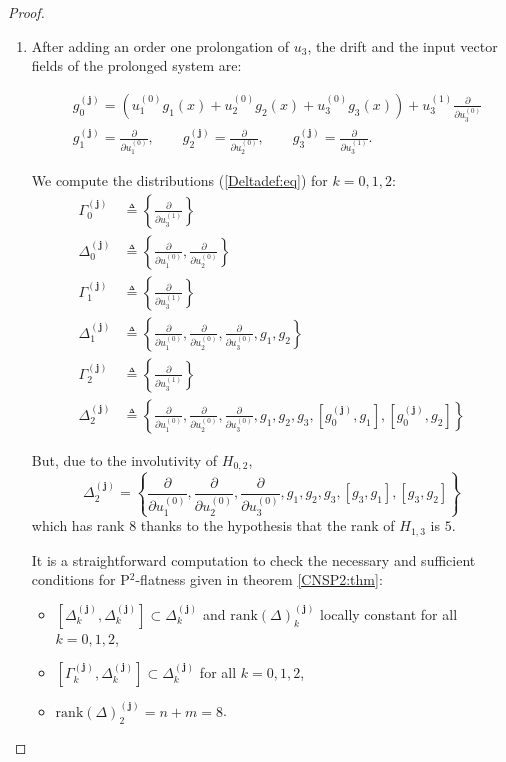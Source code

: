 \documentclass[10pt,a4paper]{amsart}
\newcommand{\ddu}[2]{\frac{\partial}{\partial u_{#1}^{(#2)}}}
\newcommand{\mbf}[1]{\mathbf{#1}}
\newcommand{\rk}[1]{\mathrm{rank} \left(#1\right)}
\begin{document}
\begin{proof}

\begin{enumerate}
  \item After adding an order one prolongation of $u_3$, the drift and the input vector fields  of the prolonged system are:

\begin{equation}\label{prolvecfields5states:eq}
\begin{aligned}
&g_{0}^{(\mbf{j})}= \left(u_{1}^{(0)}g_{1}(x) + u_{2}^{(0)}g_{2}(x) + u_{3}^{(0)}g_{3}(x)\right) +   u_{3}^{(1)}\ddu{3}{0}\\
&g_{1}^{(\mbf{j})}= \ddu{1}{0}, \qquad g_{2}^{(\mbf{j})}= \ddu{2}{0}, \qquad g_{3}^{(\mbf{j})}= \ddu{3}{1}.
\end{aligned}
\end{equation}

We compute the distributions (\ref{Deltadef:eq}) for $k=0,1,2$:
\begin{equation}
\begin{aligned}
 \Gamma_{0}^{(\mbf{j})} &\triangleq \left\{ \ddu{3}{1} \right\} \\
\Delta_{0}^{(\mbf{j})} &\triangleq \left\{ \ddu{1}{0}  , \ddu{2}{0} \right\}\\
\Gamma_{1}^{(\mbf{j})} &\triangleq \left\{ \ddu{3}{1} \right\} \\
\Delta_{1}^{(\mbf{j})} &\triangleq \left\{ \ddu{1}{0}  , \ddu{2}{0}, \ddu{3}{0}, g_1, g_2 \right\}\\
\Gamma_{2}^{(\mbf{j})} &\triangleq \left\{ \ddu{3}{1} \right\} \\
\Delta_{2}^{(\mbf{j})} &\triangleq \left\{ \ddu{1}{0}  , \ddu{2}{0}, \ddu{3}{0}, g_1, g_2,g_3,[g_0^{(\mbf{j})},g_1], [g_0^{(\mbf{j})},g_2] \right\}
\end{aligned}
\end{equation}

But, due to the involutivity of $H_{0,2}$,
\[ \Delta_{2}^{(\mbf{j})} =\left\{ \ddu{1}{0}  , \ddu{2}{0}, \ddu{3}{0}, g_1, g_2,g_3,[g_3,g_1], [g_3,g_2] \right\} \]
which has rank $8$ thanks to the hypothesis that the rank of $H_{1,3}$ is $5$.

It is a straightforward computation to check the necessary and sufficient conditions for P$^2$-flatness given in theorem \ref{CNSP2:thm}:
\begin{itemize}
\item[(i)] $[\Delta_{k}^{(\mbf{j})}, \Delta_{k}^{(\mbf{j})}] \subset \Delta_{k}^{(\mbf{j})}$ and $\rk \Delta_{k}^{(\mbf{j})}$  locally constant for all $k=0,1,2$,
\item[(ii)]$[\Gamma_{k}^{(\mbf{j})}, \Delta_{k}^{(\mbf{j})}] \subset \Delta_{k}^{(\mbf{j})}$ for all $k=0,1,2$,
\item[(iii)] $\rk \Delta_{2}^{(\mbf{j})} = n+m=8$.
\end{itemize}


\end{enumerate}
\end{proof}
\end{document}
